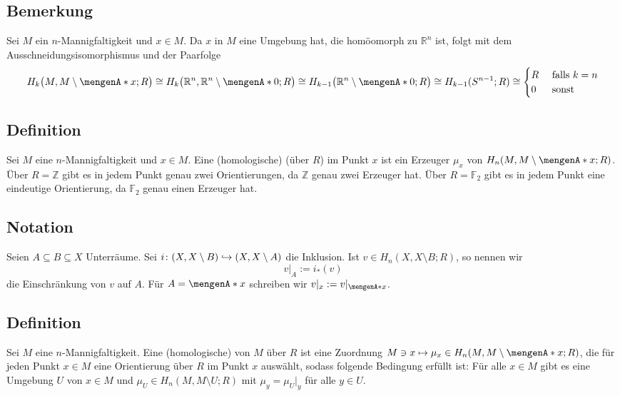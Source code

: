 \subsection[Bemerkung zur Homologie von Mannigfaltigkeiten]{Bemerkung} %
\label{sub:162}
Sei $M$ ein $n$-Mannigfaltigkeit und $x \in M$. Da $x$ in $M$ eine Umgebung hat, die homöomorph zu $\mathds{R}^n$ ist, folgt mit dem Ausschneidungsisomorphismus und der 
Paarfolge
\[
	H_k\enbrace[\big]{M, M\setminus \set{x};R} \cong H_k \enbrace[\big]{\mathds{R}^n,  \mathds{R}^n \setminus \set{0};R} \cong H_{k-1}\enbrace[\big]{\mathds{R}^n \setminus 
	\set{0};R} \cong H_{k-1}(S^{n-1};R)\cong \begin{cases}
		R &\text{ falls }k=n\\
		0 &\text{ sonst}
	\end{cases}
\]

\subsection[Definition: Homologische Orientierung in einem Punkt]{Definition} %
\label{sub:163}
Sei $M$ eine $n$-Mannigfaltigkeit und $x \in M$. Eine (homologische)  (über $R$) im Punkt $x$ ist ein Erzeuger $\mu_x$ von $H_n(M,M\setminus \set{x};R)$.
Über $R=\mathds{Z}$ gibt es in jedem Punkt genau zwei Orientierungen, da $\mathds{Z}$ genau zwei Erzeuger hat. Über $R=\mathds{F}_2$ gibt es in jedem Punkt eine eindeutige
Orientierung, da $\mathds{F}_2$ genau einen Erzeuger hat.

\subsection[Notation: Einschränkung eines Elementes $v\in H_n(X,X\setminus B;R)$]{Notation} %
\label{sub:164}
Seien $A \subseteq B \subseteq X$ Unterräume. Sei $i\colon (X,X\setminus B) \hookrightarrow \enbrace*{X,X\setminus A}$ die Inklusion. Ist $v\in H_n(X,X\setminus B;R)$, so
nennen wir 
\[
	v\big|_A := i_*(v)
\]
die Einschränkung von $v$ auf $A$. Für $A=\set{x}$ schreiben wir $v|_x := v|_{\set{x}}$.

\subsection[Definition: Homologische Orientierung der gesamten Mannigfaltigkeit]{Definition} %
\label{sub:165}
Sei $M$ eine $n$-Mannigfaltigkeit. Eine (homologische)  von $M$ über $R$ ist eine Zuordnung 
$M \ni x \mapsto \mu_x \in H_n(M,M \setminus\set{x};R)$, die für jeden Punkt $x\in M$ eine Orientierung über $R$ im Punkt $x$ auswählt, sodass folgende Bedingung erfüllt ist:
Für alle $x \in M$ gibt es eine Umgebung $U$ von $x \in M$ und $\mu_U \in H_n(M,M \setminus U;R)$ mit $\mu_y =\mu_U|_y$ für alle $y \in U$.

